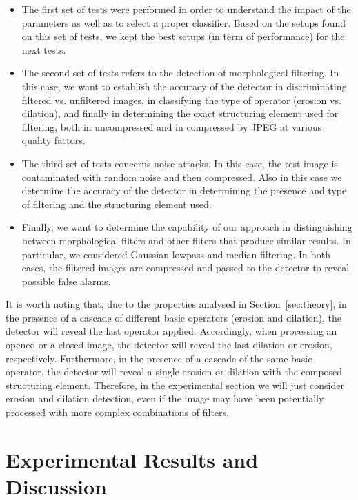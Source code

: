 \documentclass[review]{elsarticle}
\begin{document}
\begin{itemize}
\item The first set of tests were performed in order to understand the impact of the parameters as well as to select a proper classifier. Based on the setups found on this set of tests, we kept the best setups (in term of performance) for the next tests.

\item The second set of tests refers to the detection of morphological filtering. In this case, we want to establish the accuracy of the detector in discriminating filtered vs. unfiltered images, in classifying the type of operator (erosion vs. dilation), and finally in determining the exact structuring element used for filtering, both in uncompressed and in compressed by JPEG at various quality factors. 

\item The third set of tests concerns noise attacks. In this case, the test image is contaminated with random noise and then compressed. Also in this case we determine the accuracy of the detector in determining the presence and type of filtering and the structuring element used.

\item Finally, we want to determine the capability of our approach in distinguishing between morphological filters and other filters that produce similar results. In particular, we considered Gaussian lowpass and median filtering. In both cases, the filtered images are compressed and passed to the detector to reveal possible false alarms.
	
\end{itemize}

It is worth noting that, due to the properties analysed in Section~\ref{sec:theory}, in the presence of a cascade of different basic operators (erosion and dilation), the detector will reveal the last operator applied. Accordingly, when processing an opened or a closed image, the detector will reveal the last dilation or erosion, respectively. Furthermore, in the presence of a cascade of the same basic operator, the detector will reveal a single erosion or dilation with the composed structuring element. Therefore, in the experimental section we will just consider erosion and dilation detection, even if the image may have been potentially processed with more complex combinations of filters.


\section{Experimental Results and Discussion}
\label{sec:experiments}
\end{document}

